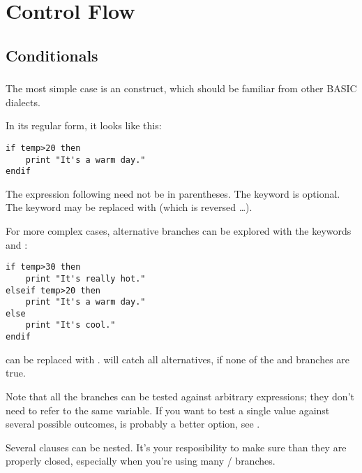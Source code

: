 
\chapter{Control Flow}


\section{Conditionals}

\subsection{}

The most simple case is an  construct, which should be
familiar from other BASIC dialects.

In its regular form, it looks like this:

\begin{lstlisting}
if temp>20 then
	print "It's a warm day."
endif
\end{lstlisting}

The expression following  need not be in parentheses. The keyword
 is optional. The keyword  may be replaced with
 (which is  reversed \ldots).

For more complex cases, alternative branches can be explored with the
keywords  and :

\begin{lstlisting}
if temp>30 then
	print "It's really hot."
elseif temp>20 then
	print "It's a warm day."
else
	print "It's cool."
endif
\end{lstlisting}

 can be replaced with .  will catch all
alternatives, if none of the  and  branches are true.

Note that all the branches can be tested against arbitrary expressions;
they don't need to refer to the same variable. If you want to test a
single value against several possible outcomes, 
is probably a better option, see .

Several  clauses can be nested. It's your resposibility to make
sure than they are properly closed, especially when you're using many
/ branches.

